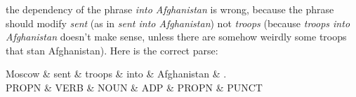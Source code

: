 \begin{parts}
    the dependency of the phrase \emph{into Afghanistan} is wrong, because the phrase should modify \emph{sent} (as in \textit{sent into Afghanistan}) not \emph{troops} (because \textit{troops into Afghanistan} doesn't make sense, unless there are somehow weirdly some troops that stan Afghanistan). Here is the correct parse:

    \begin{center}
        {
            \begin{dependency}
                \begin{deptext}
                    Moscow  \& sent \& troops \& into  \& Afghanistan \& .     \\
                    PROPN \& VERB  \& NOUN  \& ADP \& PROPN \& PUNCT \\
                \end{deptext}
            \end{dependency}
        }
    \end{center}


\end{parts}
